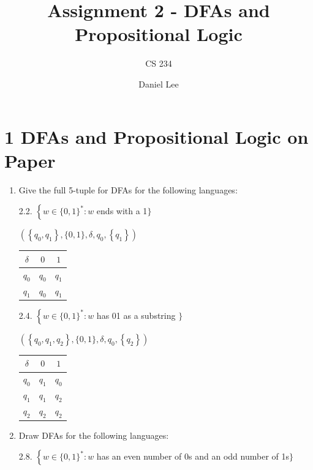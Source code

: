 \documentclass[10pt]{article}
\title{Assignment 2 - DFAs and Propositional Logic}
\author{CS 234}
\date{Daniel Lee}
\begin{document}
\maketitle

\section*{1 \quad DFAs and Propositional Logic on Paper}

\begin{enumerate}[label={}]
      \item Give the full 5-tuple for DFAs for the following languages:


            2.2. $\left\{w \in\{0,1\}^*: w\right.$ ends with a 1$\}$

            $\left(\left\{q_0, q_1\right\},\{0,1\}, \delta, q_0,\left\{q_1\right\}\right)$


            \begin{tabular}{ |c|c|c|  }
                  \hline
                  $\delta$ & $0$   & $1$   \\
                  \hline
                  $q_0$    & $q_0$ & $q_1$ \\
                  $q_1$    & $q_0$ & $q_1$ \\
                  \hline
            \end{tabular}


            2.4. $\left\{w \in\{0,1\}^*: w\right.$ has 01 as a substring $\}$

            $\left(\left\{q_0, q_1, q_2\right\},\{0,1\}, \delta, q_0,\left\{q_2\right\}\right)$

            \begin{tabular}{ |c|c|c|  }
                  \hline
                  $\delta$ & $0$   & $1$   \\
                  \hline
                  $q_0$    & $q_1$ & $q_0$ \\
                  $q_1$    & $q_1$ & $q_2$ \\
                  $q_2$    & $q_2$ & $q_2$ \\
                  \hline
            \end{tabular} 

      \item Draw DFAs for the following languages:


            2.8. $\left\{w \in\{0,1\}^*: w\right.$ has an even number of 0s and an odd number of 1s$\}$



\end{enumerate}
\end{document}
